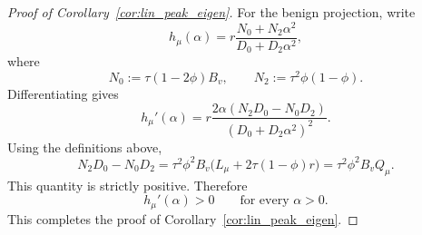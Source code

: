\documentclass[10pt,a4paper]{amsart}
\begin{document}
\begin{proof}[Proof of Corollary~\ref{cor:lin_peak_eigen}]
For the benign projection, write
\[
h_\mu(\alpha)
=
r\frac{N_0+N_2\alpha^2}{D_0+D_2\alpha^2},
\]
where
\[
N_0:=\tau(1-2\phi)B_v,
\qquad
N_2:=\tau^2\phi(1-\phi).
\]
Differentiating gives
\[
h_\mu'(\alpha)
=
r\frac{2\alpha(N_2D_0-N_0D_2)}
{(D_0+D_2\alpha^2)^2}.
\]
Using the definitions above,
\[
N_2D_0-N_0D_2
=
\tau^2\phi^2B_v
\bigl(L_\mu+2\tau(1-\phi)r\bigr)
=
\tau^2\phi^2B_vQ_\mu.
\]
This quantity is strictly positive. Therefore
\[
h_\mu'(\alpha)>0
\qquad
\text{for every } \alpha>0.
\]
This completes the proof of Corollary~\ref{cor:lin_peak_eigen}.
\end{proof}
\end{document}
